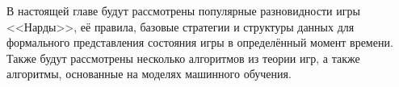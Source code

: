 В настоящей главе будут рассмотрены популярные разновидности игры <<Нарды>>, её правила, базовые стратегии и структуры данных для формального представления состояния игры в определённый момент времени. Также будут рассмотрены несколько алгоритмов из теории игр, а также алгоритмы, основанные на моделях машинного обучения.
